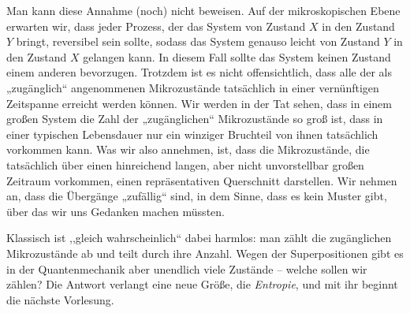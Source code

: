 Man kann diese Annahme (noch) nicht beweisen. Auf der mikroskopischen Ebene erwarten wir, dass jeder Prozess, der das System von Zustand $X$ in den Zustand $Y$ bringt, reversibel sein sollte, sodass das System genauso leicht von Zustand $Y$ in den Zustand $X$ gelangen kann. In diesem Fall sollte das System keinen Zustand einem anderen bevorzugen. Trotzdem ist es nicht offensichtlich, dass alle der als „zugänglich“ angenommenen Mikrozustände tatsächlich in einer vernünftigen Zeitspanne erreicht werden können. Wir werden in der Tat sehen, dass in einem großen System die Zahl der „zugänglichen“ Mikrozustände so groß ist, dass in einer typischen Lebensdauer nur ein winziger Bruchteil von ihnen tatsächlich vorkommen kann. Was wir also annehmen, ist, dass die Mikrozustände, die tatsächlich über einen hinreichend langen, aber nicht unvorstellbar großen Zeitraum vorkommen, einen repräsentativen Querschnitt darstellen. Wir nehmen an, dass die Übergänge „zufällig“ sind, in dem Sinne, dass es kein Muster gibt, über das wir uns Gedanken machen müssten.

Klassisch ist ,,gleich wahrscheinlich`` dabei harmlos: man zählt die zugänglichen Mikrozustände ab und teilt durch ihre Anzahl. Wegen der Superpositionen gibt es in der Quantenmechanik aber unendlich viele Zustände -- welche sollen wir zählen? Die Antwort verlangt eine neue Größe, die \emph{Entropie}, und mit ihr beginnt die nächste Vorlesung.